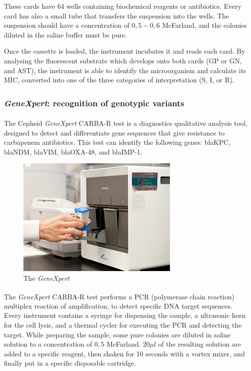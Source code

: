 \documentclass[11pt]{report}
\begin{document}
These cards have 64 wells containing biochemical reagents or antibiotics. Every card has also a small tube that transfers the suspension into the wells.
The suspension should have a concentration of $0,5-0,6$ McFarland, and the colonies diluted in the saline buffer must be pure.

Once the cassette is loaded, the instrument incubates it and reads each card.
By analysing the fluorescent substrate which develops onto both cards (GP or GN, and AST), the instrument is able to identify the microorganism and calculate its MIC, converted into one of the three categories of interpretation (S, I, or R).

\subsubsection{\emph{GeneXpert}\textsuperscript{\textregistered}: recognition of genotypic variants}
The Cepheid \emph{GeneXpert}\textsuperscript{\textregistered} CARBA-R test is a diagnostics qualitative analysis tool, designed to detect and differentiate gene sequences that give resistance to carbapenem antibiotics.
This test can identify the following genes: blaKPC, blaNDM, blaVIM, blaOXA-48, and blaIMP-1.

\begin{figure}[htp]
\centering
\includegraphics[scale=1.00]{img/genexpert.jpg}
\caption{The \emph{GeneXpert}}
\label{}
\end{figure}

The \emph{GeneXpert}\textsuperscript{\textregistered} CARBA-R test performs a PCR (polymerase chain reaction) multiplex reaction of amplification, to detect specific DNA target sequences.
Every instrument contains a syringe for dispensing the sample, a ultrasonic horn for the cell lysis, and a thermal cycler for executing the PCR and detecting the target.
While preparing the sample, some pure colonies are diluted in saline solution to a concentration of $0,5$ McFarland. 
$20\mu l$ of the resulting solution are added to a specific reagent, then shaken for 10 seconds with a vortex mixer, and finally put in a specific disposable cartridge.
\end{document}
